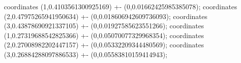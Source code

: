 coordinates {(1,0.4103561300925169) +- (0,0.01662425985385078)};
coordinates {(2,0.47975265941950634) +- (0,0.018606942609736093)};
coordinates {(3,0.43878690921337105) +- (0,0.01927585623551266)};
coordinates {(1,0.27319688542825366) +- (0,0.05070077329968354)};
coordinates {(2,0.27008982202447157) +- (0,0.05332209344480569)};
coordinates {(3,0.26884288097886533) +- (0,0.05583810159414943)};
